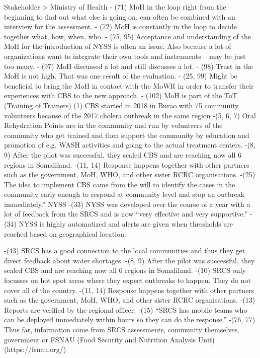 Stakeholder > Ministry of Health
-	(71) MoH in the loop right from the beginning to find out what else is going on, can often be combined with an interview for the assessment.
-	(72) MoH is constantly in the loop to decide together what, how, when, who.
-	(75, 95) Acceptance and understanding of the MoH for the introduction of NYSS is often an issue. Also because a lot of organizations want to integrate their own tools and instruments – may be just too many.
-	(97) MoH discussed a lot and still discusses a lot.
-	(98) Trust in the MoH is not high. That was one result of the evaluation.
-	(25, 99) Might be beneficial to bring the MoH in contact with the MoWR in order to transfer their experiences with CBS to the new approach.
-	(102) MoH is part of the ToT (Training of Trainers)
(1) CBS started in 2018 in Burao with 75 community volunteers because of the 2017 cholera outbreak in the same region
-(5, 6, 7) Oral Rehydration Points are in the community and run by volunteers of the community who get trained and then support the community by education and promotion of e.g. WASH activities and going to the actual treatment centers.
-(8, 9) After the pilot was successful, they scaled CBS and are reaching now all 6 regions in Somaliland.
-(11, 14) Response happens together with other partners such as the government, MoH, WHO, and other sister RCRC organisations.
-(25) The idea to implement CBS came from the will to identify the cases in the community early enough to respond at community level and stop an outbreak immediately.”
NYSS
-(33) NYSS was developed over the course of a year with a lot of feedback from the SRCS and is now “very effective and very supportive.”
-(34) NYSS is highly automatized and alerts are given when thresholds are reached based on geographical location.




-(43) SRCS has a good connection to the local communities and thus they get direct feedback about water shortages.
-(8, 9) After the pilot was successful, they scaled CBS and are reaching now all 6 regions in Somaliland.
-(10) SRCS only focusses on hot spot areas where they expect outbreaks to happen. They do not cover all of the country.
-(11, 14) Response happens together with other partners such as the government, MoH, WHO, and other sister RCRC organisations.
-(13) Reports are verified by the regional officer.
-(15) “SRCS has mobile teams who can be deployed immediately within hours so they can do the response.”
-(76, 77) Thus far, information come from SRCS assessments, community themselves, government or FSNAU (Food Security and Nutrition Analysis Unit) (https://fsnau.org/)






